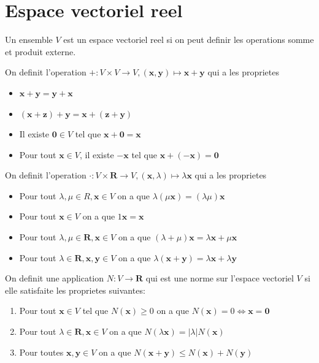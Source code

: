 \section{Espace vectoriel reel}

Un ensemble $V$ est un espace vectoriel reel si on peut definir les operations somme et produit externe.
\begin{definition}
On definit l'operation $+:V\times V\to V, (\boldsymbol{x},\boldsymbol{y})\mapsto \boldsymbol{x}+\boldsymbol{y}$ qui a les proprietes
\begin{itemize}
\item $\boldsymbol{x}+\boldsymbol{y}=\boldsymbol{y}+\boldsymbol{x}$
\item $(\boldsymbol{x}+\boldsymbol{z})+\boldsymbol{y}=\boldsymbol{x}+(\boldsymbol{z}+\boldsymbol{y})$
\item Il existe $\boldsymbol{0}\in V$ tel que $\boldsymbol{x}+\boldsymbol{0}=\boldsymbol{x}$
\item Pour tout $\boldsymbol{x}\in V$, il existe $-\boldsymbol{x}$ tel que $\boldsymbol{x}+(-\boldsymbol{x})=\boldsymbol{0}$
\end{itemize}
\end{definition}
\begin{definition}
On definit l'operation $\cdot:V\times \mathbf{R}\to V,(\boldsymbol{x},\lambda)\mapsto\lambda \boldsymbol{x}$ qui a les proprietes
\begin{itemize}
\item Pour tout $\lambda,\mu \in R,\boldsymbol{x}\in V$ on a que $\lambda(\mu \boldsymbol{x})=(\lambda \mu)\boldsymbol{x}$
\item Pour tout $\boldsymbol{x}\in V$ on a que $1\boldsymbol{x}=\boldsymbol{x}$
\item Pour tout $\lambda,\mu \in \mathbf{R},\boldsymbol{x}\in V$ on a que $(\lambda+\mu)\boldsymbol{x}=\lambda \boldsymbol{x}+\mu \boldsymbol{x}$
\item Pour tout $\lambda \in \mathbf{R},\boldsymbol{x},\boldsymbol{y}\in V$ on a que $\lambda(\boldsymbol{x}+\boldsymbol{y})=\lambda \boldsymbol{x}+\lambda \boldsymbol{y}$ 
\end{itemize}
\end{definition}
\begin{definition}[Norme]
On definit une application $N:V\to \mathbf{R}$ qui est une norme sur l'espace vectoriel $V$ si elle satisfaite les proprietes suivantes:
\begin{enumerate}
\item \label{propiete3} Pour tout $\boldsymbol{x}\in V$ tel que $N(\boldsymbol{x})\geq0$ on a que $N(\boldsymbol{x})=0\Leftrightarrow \boldsymbol{x}=\boldsymbol{0}$
\item Pour tout $\lambda \in \mathbf{R},\boldsymbol{x}\in V$ on a que $N(\lambda \boldsymbol{x})=|\lambda|N(\boldsymbol{x})$
\item Pour toutes $\boldsymbol{x},\boldsymbol{y}\in V$ on a que $N(\boldsymbol{x}+\boldsymbol{y})\leq N(\boldsymbol{x})+N(\boldsymbol{y})$
\end{enumerate}
\end{definition}
